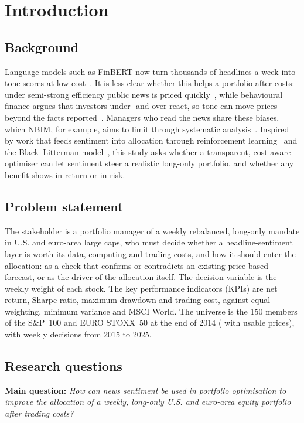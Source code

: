 \section{Introduction}\label{sec:intro}
\subsection{Background}
Language models such as FinBERT now turn thousands of headlines a week into tone scores at low cost~\cite{araci,kirtac}. It is less clear whether this helps a portfolio after costs: under semi-strong efficiency public news is priced quickly~\cite{fama}, while behavioural finance argues that investors under- and over-react, so tone can move prices beyond the facts reported~\cite{bsv,tetlock2007}. Managers who read the news share these biases, which NBIM, for example, aims to limit through systematic analysis~\cite{nbim2025}. Inspired by work that feeds sentiment into allocation through reinforcement learning~\cite{coriat} and the Black--Litterman model~\cite{colasanto}, this study asks whether a transparent, cost-aware optimiser can let sentiment steer a realistic long-only portfolio, and whether any benefit shows in return or in risk.

\subsection{Problem statement}
The stakeholder is a portfolio manager of a weekly rebalanced, long-only mandate in U.S. and euro-area large caps, who must decide whether a headline-sentiment layer is worth its data, computing and trading costs, and how it should enter the allocation: as a check that confirms or contradicts an existing price-based forecast, or as the driver of the allocation itself. The decision variable is the weekly weight of each stock. The key performance indicators (KPIs) are net return, Sharpe ratio, maximum drawdown and trading cost, against equal weighting, minimum variance and MSCI World. The universe is the 150 members of the S\&P~100 and EURO STOXX~50 at the end of 2014 (\Firms{} with usable prices), with weekly decisions from 2015 to 2025.

\subsection{Research questions}
\textbf{Main question:} \emph{How can news sentiment be used in portfolio optimisation to improve the allocation of a weekly, long-only U.S. and euro-area equity portfolio after trading costs?}

